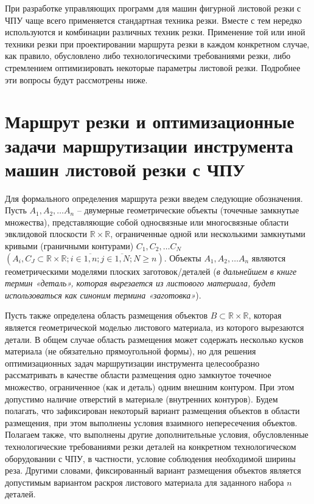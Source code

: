 \documentclass[12pt,twoside]{report}
\begin{document}
При разработке управляющих программ для
машин фигурной листовой резки с ЧПУ чаще всего
применяется стандартная техника резки.
Вместе с тем нередко используются и
комбинации различных техник резки.
Применение той или иной техники резки
при проектировании маршрута резки в
каждом конкретном случае, как правило,
обусловлено либо технологическими требованиями резки,
либо стремлением оптимизировать некоторые
параметры листовой резки.
Подробнее эти вопросы будут рассмотрены ниже.

\section{Маршрут резки и оптимизационные задачи маршрутизации инструмента машин листовой резки с ЧПУ}

Для формального определения маршрута резки
введем следующие обозначения.
Пусть
$A_1, A_2, \dots A_n$
– двумерные геометрические объекты (точечные замкнутые множества),
представляющие собой односвязные или
многосвязные области эвклидовой плоскости
$\mathbb R \times \mathbb R$,
ограниченные одной или несколькими замкнутыми кривыми
(граничными контурами)
$C_1, C_2, \dots C_N$
$(A_i, C_J \subset \mathbb R \times \mathbb R;
i \in \overline{1,n};
j \in \overline{1, N};
N \geqslant n)$.
Объекты
$A_1, A_2, \dots A_n$
являются геометрическими моделями плоских заготовок/деталей
({\it в дальнейшем в книге термин «деталь»,
которая вырезается из листового материала,
будет использоваться как синоним термина «заготовка»}).

Пусть также определена область размещения объектов
$B \subset \mathbb R \times \mathbb R$,
которая является геометрической моделью листового материала,
из которого вырезаются детали.
В общем случае область размещения
может содержать несколько кусков материала
(не обязательно прямоугольной формы),
но для решения оптимизационных задач
маршрутизации инструмента целесообразно рассматривать
в качестве области размещения одно замкнутое точечное множество,
ограниченное (как и деталь)
одним внешним контуром.
При этом допустимо наличие отверстий в материале
(внутренних контуров).
Будем полагать, что зафиксирован некоторый вариант размещения
объектов в области размещения,
при этом выполнены условия взаимного непересечения объектов.
Полагаем также, что выполнены другие дополнительные условия,
обусловленные технологические требованиями резки деталей
на конкретном технологическом оборудовании с ЧПУ,
в частности, условие соблюдения необходимой ширины реза.
Другими словами, фиксированный вариант размещения объектов
является допустимым вариантом раскроя листового материала
для заданного набора $n$ деталей.
\end{document}
